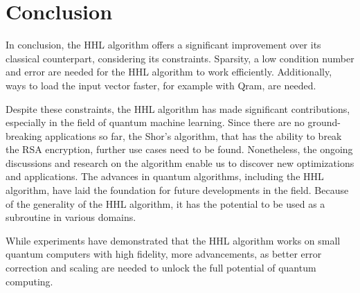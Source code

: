 \section{Conclusion}

In conclusion, the HHL algorithm offers a significant improvement over its classical counterpart, considering its constraints.
Sparsity, a low condition number and error are needed for the HHL algorithm to work efficiently.
Additionally, ways to load the input vector faster, for example with Qram, are needed. 

Despite these constraints, the HHL algorithm has made significant contributions, especially in the field of quantum machine learning. 
Since there are no ground-breaking applications so far, the Shor's algorithm, that has the ability to break the RSA encryption, further use cases need to be found.
Nonetheless, the ongoing discussions and research on the algorithm enable us to discover new optimizations and applications.
The advances in quantum algorithms, including the HHL algorithm, have laid the foundation for future developments in the field.
Because of the generality of the HHL algorithm, it has the potential to be used as a subroutine in various domains.

While experiments have demonstrated that the HHL algorithm works on small quantum computers with high fidelity, 
more advancements, as better error correction and scaling are needed to unlock the full potential of quantum computing.



